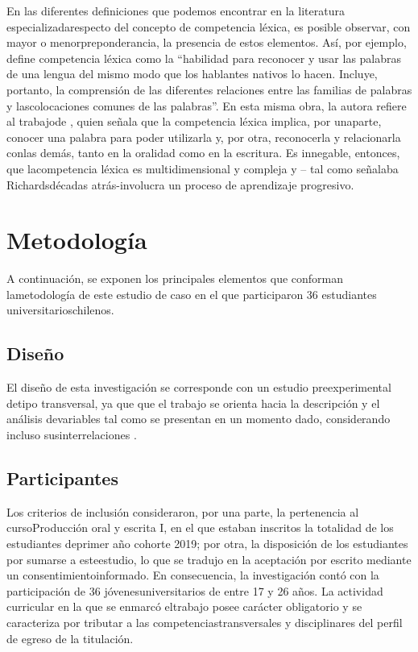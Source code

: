 \documentclass{textolivre}
\begin{document}
En las diferentes definiciones que podemos encontrar en la literatura
especializadarespecto del concepto de competencia léxica, es posible observar,
con mayor o menorpreponderancia, la presencia de estos elementos. Así, por
ejemplo, \textcite[p. 57]{molina2007} define competencia léxica como la
“habilidad para reconocer y usar las palabras de una lengua del mismo modo que
los hablantes nativos lo hacen. Incluye, portanto, la comprensión de las
diferentes relaciones entre las familias de palabras y lascolocaciones comunes
de las palabras”. En esta misma obra, la autora refiere al trabajode \textcite[p. 152]{catalan2002},
quien señala que la competencia léxica implica, por
unaparte, conocer una palabra para poder utilizarla y, por otra, reconocerla y
relacionarla conlas demás, tanto en la oralidad como en la escritura. Es
innegable, entonces, que lacompetencia léxica es multidimensional y compleja y
-- tal como señalaba Richardsdécadas atrás-involucra un proceso de aprendizaje
progresivo.



\section{Metodología}\label{sec-metodologia}
A continuación, se exponen los principales elementos que conforman
lametodología de este estudio de caso en el que participaron 36 estudiantes
universitarioschilenos.

\subsection{Diseño}\label{sec-diseno}
El diseño de esta investigación se corresponde con un estudio preexperimental
detipo transversal, ya que que el trabajo se orienta hacia la descripción y el
análisis devariables tal como se presentan en un momento dado, considerando
incluso susinterrelaciones \cite{acuna2006}.

\subsection{Participantes}\label{sec-participantes}
Los criterios de inclusión consideraron, por una parte, la pertenencia al
cursoProducción oral y escrita I, en el que estaban inscritos la totalidad de
los estudiantes deprimer año cohorte 2019; por otra, la disposición de los
estudiantes por sumarse a esteestudio, lo que se tradujo en la aceptación por
escrito mediante un consentimientoinformado. En consecuencia, la investigación
contó con la participación de 36 jóvenesuniversitarios de entre 17 y 26 años.
La actividad curricular en la que se enmarcó eltrabajo posee carácter
obligatorio y se caracteriza por tributar a las competenciastransversales y
disciplinares del perfil de egreso de la titulación.
\end{document}
